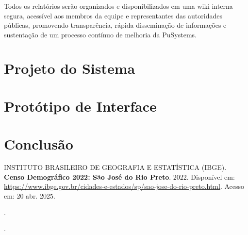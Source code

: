 \documentclass[a5paper, 12pt]{article}
\begin{document}
Todos os relatórios serão organizados e disponibilizados em uma wiki interna segura, acessível aos membros da equipe e representantes das autoridades públicas, promovendo transparência, rápida disseminação de informações e sustentação de um processo contínuo de melhoria da PuSystems.

\section{Projeto do Sistema}

\newpage
\section{Protótipo de Interface}

\newpage
\section{Conclusão}

\newpage
\renewcommand{\refname}{Bibliografia}
\begin{thebibliography}{09}
 INSTITUTO BRASILEIRO DE GEOGRAFIA E ESTATÍSTICA (IBGE). 
\textbf{Censo Demográfico 2022: São José do Rio Preto}. 
2022. 
Disponível em: \url{https://www.ibge.gov.br/cidades-e-estados/sp/sao-jose-do-rio-preto.html}. 
Acesso em: 20 abr. 2025.

\bibitem{} %
\textbf{}. %

\bibitem{} %
\textbf{}. %

\end{thebibliography}
\end{document}
